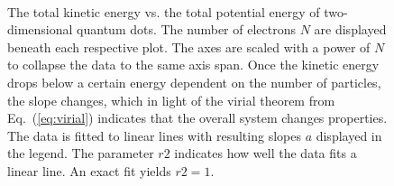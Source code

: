\begin{figure}[h]
 \begin{center}
   \\
  \caption{The total kinetic energy vs. the total potential energy of two-dimensional quantum dots. The number of electrons $N$ are displayed beneath each respective plot. The axes are scaled with a power of $N$ to collapse the data to the same axis span. Once the kinetic energy drops below a certain energy dependent on the number of particles, the slope changes, which in light of the virial theorem from Eq.~(\ref{eq:virial}) indicates that the overall system changes properties. The data is fitted to linear lines with resulting slopes $a$ displayed in the legend. The parameter $r2$ indicates how well the data fits a linear line. An exact fit yields $r2 = 1$.}
  \label{fig:V_dist_qdots}
 \end{center}
\end{figure}
\captionsetup[subfloat]{labelformat=parens}

